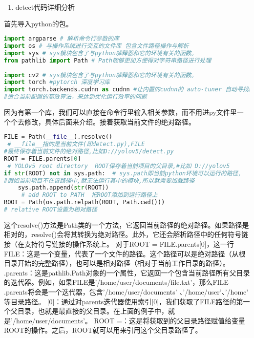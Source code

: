 

\begin{enumerate}
\item detect代码详细分析
\end{enumerate}
首先导入python的包。
\begin{lstlisting}[language=python]
import argparse # 解析命令行参数的库
import os # 与操作系统进行交互的文件库 包含文件路径操作与解析
import sys # sys模块包含了与python解释器和它的环境有关的函数。
from pathlib import Path # Path能够更加方便得对字符串路径进行处理
 
import cv2 # sys模块包含了与python解释器和它的环境有关的函数。
import torch #pytorch 深度学习库
import torch.backends.cudnn as cudnn #让内置的cudnn的 auto-tuner 自动寻找最
#适合当前配置的高效算法，来达到优化运行效率的问题
\end{lstlisting}
因为有第一个库，我们可以直接在命令行里输入相关参数，而不用进py文件里一个个去修改，具体后面来介绍。接着获取当前文件的绝对路径。
\begin{lstlisting}[language=python]
FILE = Path(__file__).resolve() 
 # __file__指的是当前文件(即detect.py),FILE
#最终保存着当前文件的绝对路径,比如D://yolov5/detect.py
ROOT = FILE.parents[0] 
 # YOLOv5 root directory  ROOT保存着当前项目的父目录,#比如 D://yolov5
if str(ROOT) not in sys.path:  # sys.path即当前python环境可以运行的路径,
#假如当前项目不在该路径中,就无法运行其中的模块,所以就需要加载路径
    sys.path.append(str(ROOT)) 
     # add ROOT to PATH  把ROOT添加到运行路径上
ROOT = Path(os.path.relpath(ROOT, Path.cwd()))
# relative ROOT设置为相对路径
\end{lstlisting}
这个resolve()方法是Path类的一个方法，它返回当前路径的绝对路径。如果路径是相对的，resolve()会将其转换为绝对路径。此外，它还会解析路径中的任何符号链接（在支持符号链接的操作系统上。
对于ROOT = FILE.parents[0]，这一行
FILE：这是一个变量，代表了一个文件的路径。这个路径可以是绝对路径（从根目录开始的完整路径），也可以是相对路径（相对于当前工作目录的路径）。
.parents：这是pathlib.Path对象的一个属性，它返回一个包含当前路径所有父目录的迭代器。例如，如果FILE是'/home/user/documents/file.txt'，那么FILE
.parents将会是一个迭代器，包含'/home/user/documents'
、'/home/user'、'/home'
等目录路径。
[0]：通过对parents迭代器使用索引[0]，我们获取了FILE路径的第一个父目录，也就是最直接的父目录。在上面的例子中，就是'/home/user/documents'。
ROOT =：这是将获取到的父目录路径赋值给变量ROOT的操作。之后，ROOT就可以用来引用这个父目录路径了。

